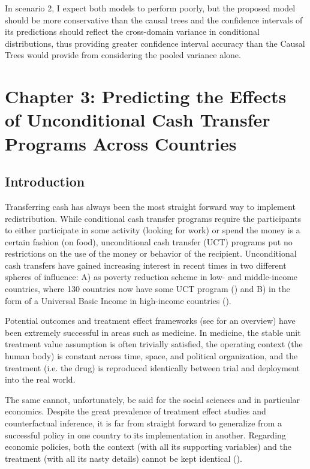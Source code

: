 \documentclass[a4paper,12pt]{article}
\begin{document}
In scenario 2, I expect both models to perform poorly, but the proposed model should be more conservative than the causal trees and the confidence intervals of its predictions should reflect the cross-domain variance in conditional distributions, thus providing greater confidence interval accuracy than the Causal Trees would provide from considering the pooled variance alone.

\section{ Chapter 3: Predicting the Effects of Unconditional Cash Transfer Programs Across Countries }

\subsection{ Introduction }

Transferring cash has always been the most straight forward way to implement redistribution. While conditional cash transfer programs require the participants to either participate in some activity (looking for work) or spend the money is a certain fashion (on food), unconditional cash transfer (UCT) programs put no restrictions on the use of the money or behavior of the recipient. Unconditional cash transfers have gained increasing interest in recent times in two different spheres of influence: A) as poverty reduction scheme in low- and middle-income countries, where 130 countries now have some UCT program (\cite[see][for a comprehensive overview]{Bastagli2016}) and B) in the form of a Universal Basic Income in high-income countries (\cite[see]{Hoynes2019}).

Potential outcomes and treatment effect frameworks (see \cite{imbens2015causal} for an overview) have been extremely successful in areas such as medicine. In medicine, the stable unit treatment value assumption is often trivially satisfied, the operating context (the human body) is constant across time, space, and political organization, and the treatment (i.e. the drug) is reproduced identically between trial and deployment into the real world.

The same cannot, unfortunately, be said for the social sciences and in particular economics. Despite the great prevalence of treatment effect studies and counterfactual inference, it is far from straight forward to generalize from a successful policy in one country to its implementation in another. Regarding economic policies, both the context (with all its supporting variables) and the treatment (with all its nasty details) cannot be kept identical (\cite{Cartwright2013}).
\end{document}
